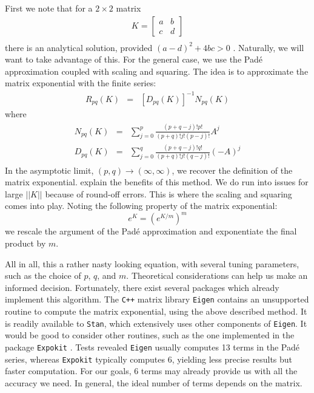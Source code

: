 \documentclass[11pt]{article}
\begin{document}
First we note that for a $2 \times 2$ matrix
\begin{eqnarray*}
   K = \left[\begin{array}{cc}
	a & b \\
	c & d
	\end{array}\right] \\
\end{eqnarray*}
%
there is an analytical solution, provided $(a - d)^2 + 4bc > 0$ \cite{ToddWeisstein}. Naturally, we will want to take
advantage of this.
%
For the general case, we use the Pad\'e approximation coupled with scaling and squaring.
The  idea is to approximate the matrix exponential with the finite series:
%
\begin{eqnarray*}
  R_{pq}(K) &=& [D_{pq}(K)]^{-1}  N_{pq}(K)
\end{eqnarray*}
%
where
%
\begin{eqnarray}
  \begin{aligned}
  N_{pq}(K) &=& \sum_{j=0}^p \frac{(p + q - j)! p!}{(p + q)! j! (p - j)!}A^j \\
  D_{pq}(K) &=& \sum_{j=0}^q \frac{(p + q - j)! q!}{(p + q)! j! (q - j)!}(-A)^j
  \end{aligned}
  \label{eq:pade}
\end{eqnarray}
%
In the asymptotic limit, $(p, q) \rightarrow (\infty, \infty)$, we recover the  definition of the 
matrix exponential. \cite{MolerAndVanLoan:2003} explain the benefits of this method.
%
We do run into issues for large $||K||$ because of round-off errors. This is where the scaling 
and squaring comes into play. Noting the following property of the matrix exponential:
%
$$ e^K = (e^{K/m})^m $$
%
we rescale the argument of the Pad\'e approximation and exponentiate the final product 
by $m$.

All in all, this a rather nasty looking equation, with several tuning parameters, such as the choice
of $p$, $q$, and $m$. Theoretical considerations can help us make an informed decision.
Fortunately, there exist several packages which already implement this algorithm.
The \texttt{C++} matrix library \texttt{Eigen} \cite{Eigen:2013} contains an unsupported routine to compute
the matrix exponential, using the above described method.
It is readily available to \texttt{Stan}, which extensively uses other components of \texttt{Eigen}.
It would be good to consider other routines, such as the one implemented in the package \texttt{Expokit} \cite{Sidje:1998}.
Tests revealed \texttt{Eigen} usually computes 13 terms in the Pad\'e series,
whereas \texttt{Expokit} typically computes 6, yielding less precise results but faster computation.
For our goals, 6 terms may already provide us with all the accuracy we need.
In general, the ideal number of terms depends on the matrix.
\end{document}
